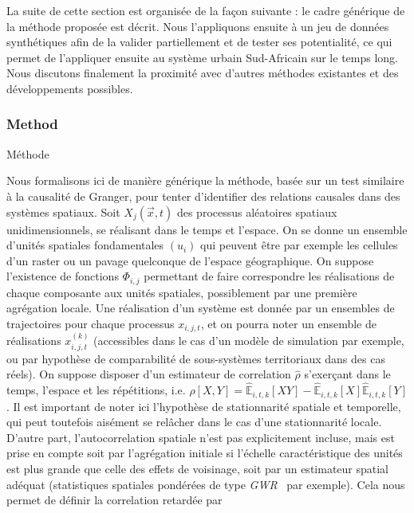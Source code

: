 La suite de cette section est organisée de la façon suivante : le cadre générique de la méthode proposée est décrit. Nous l'appliquons ensuite à un jeu de données synthétiques afin de la valider partiellement et de tester ses potentialité, ce qui permet de l'appliquer ensuite au système urbain Sud-Africain sur le temps long. Nous discutons finalement la proximité avec d'autres méthodes existantes et des développements possibles.



\subsubsection{Method}{Méthode}


Nous formalisons ici de manière générique la méthode, basée sur un test similaire à la causalité de Granger, pour tenter d'identifier des relations causales dans des systèmes spatiaux. Soit $X_j(\vec{x},t)$ des processus aléatoires spatiaux unidimensionnels, se réalisant dans le temps et l'espace. On se donne un ensemble d'unités spatiales fondamentales $(u_i)$ qui peuvent être par exemple les cellules d'un raster ou un pavage quelconque de l'espace géographique. On suppose l'existence de fonctions $\Phi_{i,j}$ permettant de faire correspondre les réalisations de chaque composante aux unités spatiales, possiblement par une première agrégation locale. Une réalisation d'un système est donnée par un ensembles de trajectoires pour chaque processus $x_{i,j,t}$, et on pourra noter un ensemble de réalisations $x^{(k)}_{i,j,t}$ (accessibles dans le cas d'un modèle de simulation par exemple, ou par hypothèse de comparabilité de sous-systèmes territoriaux dans des cas réels). On suppose disposer d'un estimateur de correlation $\hat{\rho}$ s'exerçant dans le temps, l'espace et les répétitions, i.e. $\hat{\rho}\left[X,Y\right] = \hat{\mathbb{E}}_{i,t,k}\left[XY\right] - \hat{\mathbb{E}}_{i,t,k}\left[X\right]\hat{\mathbb{E}}_{i,t,k}\left[Y\right]$. Il est important de noter ici l'hypothèse de stationnarité spatiale et temporelle, qui peut toutefois aisément se relâcher dans le cas d'une stationnarité locale. D'autre part, l'autocorrelation spatiale n'est pas explicitement incluse, mais est prise en compte soit par l'agrégation initiale si l'échelle caractéristique des unités est plus grande que celle des effets de voisinage, soit par un estimateur spatial adéquat (statistiques spatiales pondérées de type \emph{GWR}~\cite{brunsdon1998geographically} par exemple). Cela nous permet de définir la correlation retardée par

